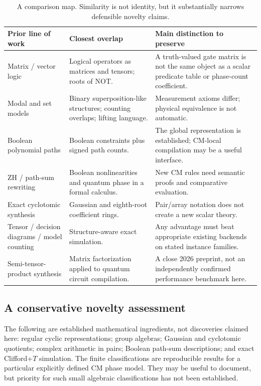 \begin{table}[htbp]
\centering\small
\begin{tabularx}{\textwidth}{@{}L{0.26\textwidth}Y Y@{}}
\toprule
Prior line of work & Closest overlap & Main distinction to preserve\\
\midrule
Matrix / vector logic & Logical operators as matrices and tensors; roots of NOT. & A truth-valued gate matrix is not the same object as a scalar predicate table or phase-count coefficient.\\
Modal and set models & Binary superposition-like structures; counting overlaps; lifting language. & Measurement axioms differ; physical equivalence is not automatic.\\
Boolean polynomial paths & Boolean constraints plus signed path counts. & The global representation is established; CM-local compilation may be a useful interface.\\
ZH / path-sum rewriting & Boolean nonlinearities and quantum phase in a formal calculus. & New CM rules need semantic proofs and comparative evaluation.\\
Exact cyclotomic synthesis & Gaussian and eighth-root coefficient rings. & Pair/array notation does not create a new scalar theory.\\
Tensor / decision diagrams / model counting & Structure-aware exact simulation. & Any advantage must beat appropriate existing backends on stated instance families.\\
Semi-tensor-product synthesis & Matrix factorization applied to quantum circuit compilation. & A close 2026 preprint, not an independently confirmed performance benchmark here.\\
\bottomrule
\end{tabularx}
\caption{A comparison map. Similarity is not identity, but it substantially narrows defensible novelty claims.}
\end{table}

\subsection{A conservative novelty assessment}
The following are established mathematical ingredients, not discoveries claimed here: regular cyclic representations; group algebras; Gaussian and cyclotomic quotients; complex arithmetic in pairs; Boolean path-sum descriptions; and exact Clifford+$T$ simulation. The finite classifications are reproducible results for a particular explicitly defined CM phase model. They may be useful to document, but priority for such small algebraic classifications has not been established.

